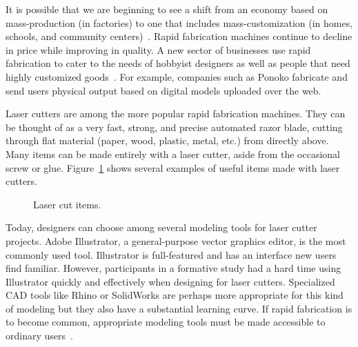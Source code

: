 \documentclass{article}
\begin{document}
It is possible that we are beginning to see a shift from an economy
based on mass-production (in factories) to one that includes
mass-customization (in homes, schools, and community
centers)~\cite{economist-fab}. Rapid fabrication machines continue to
decline in price while improving in quality. A new sector of
businesses use rapid fabrication to cater to the needs of hobbyist
designers as well as people that need highly customized
goods~\cite{nyt-rapidfab}.  For example, companies such as Ponoko
fabricate and send users physical output based on digital models
uploaded over the web.

Laser cutters are among the more popular rapid fabrication
machines. They can be thought of as a very fast, strong, and precise
automated razor blade, cutting through flat material (paper, wood,
plastic, metal, etc.) from directly above. Many items can be made
entirely with a laser cutter, aside from the occasional screw or glue.
Figure~\ref{fig:laser-example} shows several examples of useful items
made with laser cutters.

\begin{figure}[h]
\centering 
{}
\caption{Laser cut items.}
\label{fig:laser-example}
\end{figure}

Today, designers can choose among several modeling tools for laser
cutter projects. Adobe Illustrator, a general-purpose vector graphics
editor, is the most commonly used tool. Illustrator is full-featured
and has an interface new users find familiar. However, participants in
a formative study had a hard time using Illustrator quickly and
effectively when designing for laser cutters. Specialized CAD tools
like Rhino or SolidWorks are perhaps more appropriate for this kind of
modeling but they also have a substantial learning curve. If rapid
fabrication is to become common, appropriate modeling tools must be
made accessible to ordinary users~\cite{lipson-homefactory}.
\end{document}
